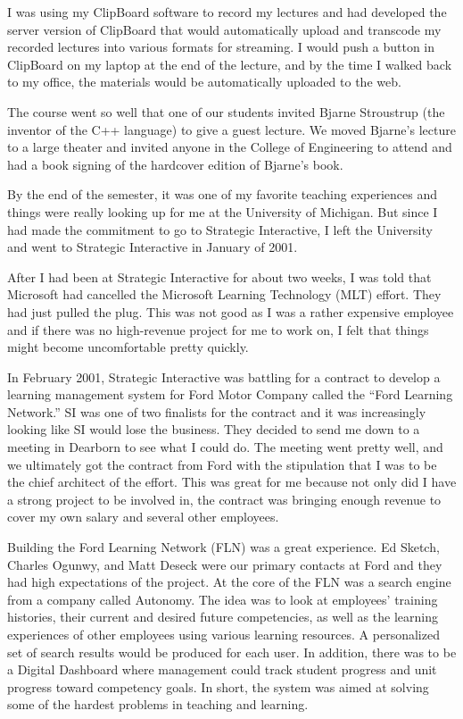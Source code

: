 \documentclass[12pt]{book}
\begin{document}
I was using my ClipBoard software to record
my lectures and had developed the server version of ClipBoard
that would automatically upload and transcode my
recorded lectures into various formats for streaming.  I would
push a button in ClipBoard on my laptop at the end of
the lecture, and by the time I walked back to my office, the
materials would be automatically uploaded to the web.

The course went so well that one of our students invited
Bjarne Stroustrup (the inventor of the C++ language)
to give a guest lecture.
We moved Bjarne's lecture to a large theater and
invited anyone in the College of Engineering to attend and
had a book signing of the hardcover edition of Bjarne's book.

By the end of the semester, it was one of my favorite teaching
experiences and things were really looking up for me at the
University of Michigan.  But since I had made the commitment
to go to Strategic Interactive, I left the University and
went to Strategic Interactive in January of 2001.

After I had been at Strategic Interactive for about two weeks,
I was told that Microsoft had cancelled the Microsoft
Learning Technology (MLT) effort.  They had just pulled the plug.
This was not good as I was a rather expensive employee
and if there was no high-revenue project for me to work on,
I felt that things might become uncomfortable pretty quickly.

In February 2001, Strategic Interactive was battling for a contract
to develop a learning management system for Ford Motor Company
called the ``Ford Learning Network.''  SI was one of two finalists
for the contract and it was increasingly looking like SI would
lose the business.  They decided to send me down to a meeting in
Dearborn to see what I could do.  The meeting went pretty well,
and we ultimately got the contract from Ford with the stipulation that
I was to be the chief architect of the effort.  This was great
for me because not only did I have a strong project to be involved in,
the contract was bringing enough revenue to cover my own salary and
several other employees.

Building the Ford Learning Network (FLN) was a great experience.  Ed Sketch,
Charles Ogunwy, and Matt Deseck were our primary contacts at Ford and
they had high expectations of the project.  At the core of the FLN
was a search engine
from a company called Autonomy.  The idea was to look at employees'
training histories, their current and desired future competencies, as well as
the learning experiences of other employees using various
learning resources. A personalized set of search results would be produced for
each user.  In addition, there was to be a Digital Dashboard where management
could track student progress and unit progress toward competency goals.
In short, the system was aimed at solving some of the hardest problems
in teaching and learning.
\end{document}
